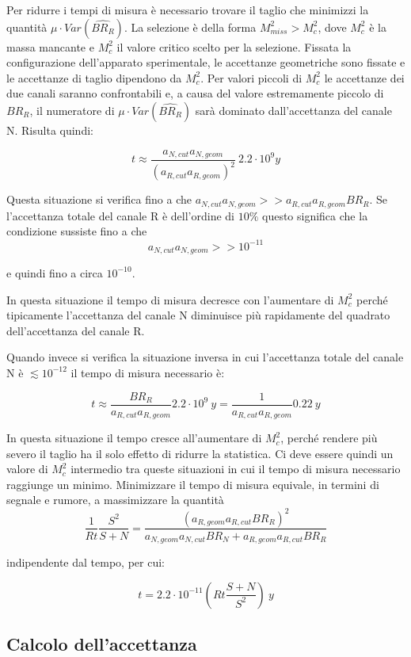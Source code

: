 \documentclass[8pt]{extarticle}
\begin{document}
Per ridurre i tempi di misura è necessario trovare il taglio che minimizzi la quantità $\mu \cdot Var(\widehat{BR_R})$. 
La selezione è della forma $M^2_{miss} > M^2_c$, dove $M^2_c$ è la massa mancante e $M^2_c$ il valore critico scelto per la selezione. Fissata la configurazione dell'apparato sperimentale, le accettanze geometriche sono fissate e le accettanze di taglio dipendono da $M^2_c$. Per valori piccoli di $M^2_c$ le accettanze dei due canali saranno confrontabili e, a causa del valore estremamente piccolo di $BR_R$, il numeratore di $\mu \cdot Var(\widehat{BR_R})$ sarà dominato dall'accettanza del canale N. Risulta quindi:

$$
t \approx \frac{a_{N, cut} a_{N, geom}}{(a_{R, cut} a_{R, geom})^2}\ 2.2 \cdot 10^9 y
$$

Questa situazione si verifica fino a che $a_{N, cut} a_{N, geom} >> a_{R, cut} a_{R, geom} BR_R$. Se l'accettanza totale del canale R è dell'ordine di $10 \%$ questo significa che la condizione sussiste fino a che 
$$
a_{N, cut} a_{N, geom} >> 10^{-11}
$$

e quindi fino a circa $10^{-10}$.

In questa situazione il tempo di misura decresce con l'aumentare di $M^2_c$ perché tipicamente l'accettanza del canale N diminuisce più rapidamente del quadrato dell'accettanza del canale R.

Quando invece si verifica la situazione inversa in cui l'accettanza totale del canale N è $\lesssim 10^{-12}$ il tempo di misura necessario è:

$$
t \approx \frac{BR_R}{a_{R, cut}a_{R,geom}} 2.2 \cdot 10^9\ y = \frac{1}{a_{R, cut}a_{R,geom}} 0.22\ y
$$

In questa situazione il tempo cresce all'aumentare di $M^2_c$, perché rendere più severo il taglio ha il solo effetto di ridurre la statistica. Ci deve essere quindi un valore di $M^2_c$ intermedio tra queste situazioni in cui il tempo di misura necessario raggiunge un minimo. Minimizzare il tempo di misura equivale, in termini di segnale e rumore, a massimizzare la quantità 
$$
\frac{1}{Rt} \frac{S^2}{S+N} = \frac{(a_{R,geom}a_{R,cut}BR_R)^2}{a_{N,geom}a_{N,cut}BR_N + a_{R,geom}a_{R,cut}BR_R}
$$

indipendente dal tempo, per cui:

$$
t = 2.2\cdot 10^{-11} (Rt \frac{S+N}{S^2})\ y
$$

\subsection{Calcolo dell'accettanza}
\end{document}
